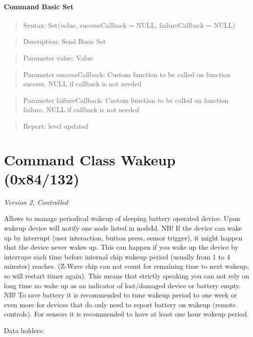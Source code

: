 \paragraph{Command Basic Set}
\begin{quote}Syntax: Set(value, successCallback = NULL, failureCallback = NULL)\end{quote}
\begin{quote}Description: Send Basic Set\end{quote}
\begin{quote}Parameter value: Value\end{quote}
\begin{quote}Parameter successCallback: Custom function to be called on function success. NULL if callback is not needed\end{quote}
\begin{quote}Parameter failureCallback: Custom function to be called on function failure. NULL if callback is not needed\end{quote}
\begin{quote}Report: level updated\end{quote}


\section{Command Class Wakeup (0x84/132)}

\textit{Version 2, Controlled}
\newline

Allows to manage periodical wakeup of sleeping battery operated device. Upon wakeup device will notify one node listed in nodeId. NB! If the device can wake up by interrupt (user interaction, button press, sensor trigger), it might happen that the device never wakes up. This can happen if you wake up the device by interrupe each time before internal chip wakeup period (usually from 1 to 4 minutes) reaches. (Z-Wave chip can not count for remaining time to next wakeup, so will restart timer again). This means that strictly speaking you can not rely on long time no wake up as an indicator of lost/damaged device or battery empty. NB! To save battery it is recommended to tune wakeup period to one week or even more for devices that do only need to report battery on wakeup (remote controls). For sensors it is recommended to have at least one hour wakeup period.
\newline

\noindent
Data holders:

